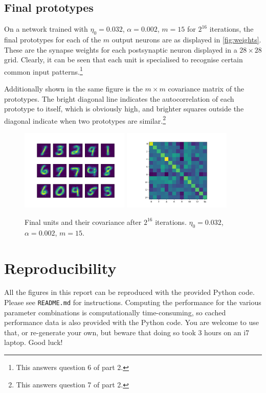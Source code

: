 \documentclass[a4paper, 11pt, twocolumn, final]{article} %
\begin{document}
\subsection{Final prototypes} On a network trained with $\eta_0 = 0.032$,
$\alpha = 0.002$, $m = 15$ for $2^{16}$ iterations, the final prototypes for
each of the $m$ output neurons are as displayed in \autoref{fig:weights}.  These
are the synapse weights for each postsynaptic neuron displayed in a $28\times28$
grid. Clearly, it can be seen that each unit is specialised to recognise certain
common input patterns.\footnote{This answers question 6 of part 2.}

Additionally shown in the same figure is the $m\times{}m$ covariance matrix of
the prototypes. The bright diagonal line indicates the autocorrelation of each
prototype to itself, which is obviously high, and brighter squares outside the
diagonal indicate when two prototypes are similar.\footnote{This answers
question 7 of part 2.}

\begin{figure}
  \includegraphics[width=0.46\textwidth]{weights.png}
  \includegraphics[width=0.46\textwidth]{unit_covariance.png}
  \caption{Final units and their covariance after $2^{16}$ iterations.
           $\eta_0 = 0.032$, $\alpha = 0.002$, $m = 15$.}
  \label{fig:weights}
\end{figure}

\section{Reproducibility} All the figures in this report can be reproduced with
the provided Python code.  Please see \texttt{README.md} for instructions.
Computing the performance for the various parameter combinations is
computationally time-consuming, so cached performance data is also provided with
the Python code.  You are welcome to use that, or re-generate your own, but
beware that doing so took 3 hours on an i7 laptop.  Good luck!
\end{document}
